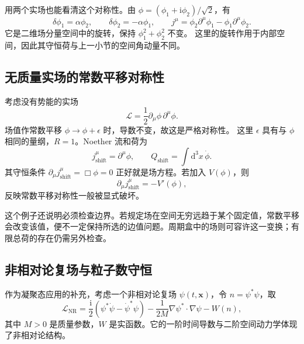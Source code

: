 用两个实场也能看清这个对称性。由
$\phi=(\phi_{1}+\mathrm{i}\phi_{2})/\sqrt2$，有
\begin{equation}
  \delta\phi_{1}=\alpha\phi_{2},\qquad
  \delta\phi_{2}=-\alpha\phi_{1},\qquad
  j^{\mu}=\phi_{2}\partial^{\mu}\phi_{1}
  -\phi_{1}\partial^{\mu}\phi_{2}.
\end{equation}
它是二维场分量空间中的旋转，保持 $\phi_{1}^{2}+\phi_{2}^{2}$ 不变。
这里的旋转作用于内部空间，因此其守恒荷与上一小节的空间角动量不同。

\subsection{无质量实场的常数平移对称性}

考虑没有势能的实场
\begin{equation}
  \mathcal{L}=\frac12\partial_{\mu}\phi\,\partial^{\mu}\phi.
\end{equation}
场值作常数平移 $\phi\longrightarrow\phi+\epsilon$ 时，导数不变，故这是严格对称性。
这里 $\epsilon$ 具有与 $\phi$ 相同的量纲，$R=1$。Noether 流和荷为
\begin{equation}
  j^{\mu}_{\mathrm{shift}}=\partial^{\mu}\phi,
  \qquad Q_{\mathrm{shift}}=\int\mathrm{d}^{3}x\,\dot\phi.
\end{equation}
其守恒条件 $\partial_{\mu}j^{\mu}_{\mathrm{shift}}=\Box\phi=0$
正好就是场方程。若加入 $V(\phi)$，则
\begin{equation}
  \partial_{\mu}j^{\mu}_{\mathrm{shift}}=-V'(\phi),
\end{equation}
反映常数平移对称性一般被显式破坏。

这个例子还说明必须检查边界。若规定场在空间无穷远趋于某个固定值，常数平移会改变该值，便不一定保持所选的边值问题。周期盒中的场则可容许这一变换；有限总荷的存在仍需另外检查。

\subsection{非相对论复场与粒子数守恒}

作为凝聚态应用的补充，考虑一个非相对论复场 $\psi(t,\bm{x})$，令
$n=\psi^{*}\psi$，取
\begin{equation}
  \mathcal{L}_{\mathrm{NR}}=
  \frac{\mathrm{i}}{2}(\psi^{*}\dot\psi-\dot\psi^{*}\psi)
  -\frac{1}{2M}\nabla\psi^{*}\cdot\nabla\psi-W(n),
  \label{eq:prelude-nr-lagrangian}
\end{equation}
其中 $M>0$ 是质量参数，$W$ 是实函数。它的一阶时间导数与二阶空间动力学体现了非相对论结构。

